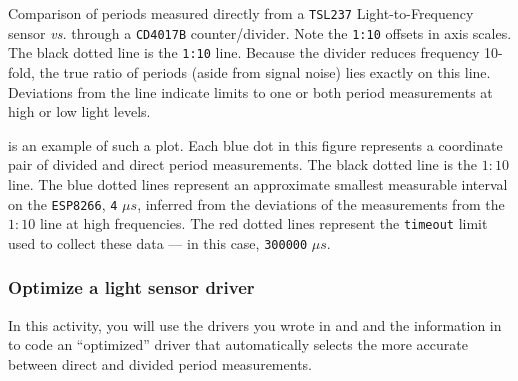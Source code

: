 \begin{marginfigure}[-8cm]
	\begin{center}
		\caption[Periods from a light sensor and frequency divider]{Comparison of periods measured directly from a \texttt{TSL237} Light-to-Frequency sensor \textit{vs.} through a \texttt{CD4017B} counter/divider.
			Note the \texttt{1:10} offsets in axis scales.
			The black dotted line is the \texttt{1:10} line.
			Because the divider reduces frequency 10-fold, the true ratio of periods (aside from signal noise) lies exactly on this line.
			Deviations from the line indicate limits to one or both period measurements at high or low light levels.}
	\end{center}
\end{marginfigure}

 is an example of such a plot.
Each blue dot in this figure represents a coordinate pair of divided and direct period measurements.
The black dotted line is the $1:10$ line.
The blue dotted lines represent an approximate smallest measurable interval on the \texttt{ESP8266}, \texttt{4} $\mu s$, inferred from the deviations of the measurements from the $1:10$ line at high frequencies.
The red dotted lines represent the \texttt{timeout} limit used to collect these data --- in this case, \texttt{300000} $\mu s$.

\subsubsection{\howto Optimize a light sensor driver}
In this activity, you will use the drivers you wrote in  and  and the information in  to code an ``optimized'' driver that automatically selects the more accurate between direct and divided period measurements.

